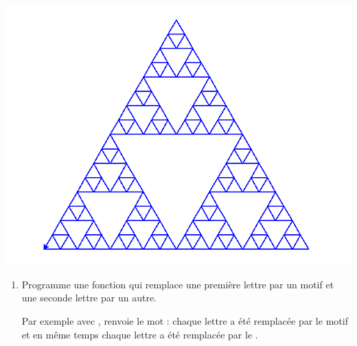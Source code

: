 \documentclass[11pt,class=report,crop=false]{standalone}
\begin{document}
\begin{activite}
\begin{enumerate}
\end{enumerate}



\end{activite}




\begin{activite}



\begin{center}	
\includegraphics[scale=\myscale,scale=0.35]{ecran-lsysteme-7e}
\end{center}

\begin{enumerate}
  \item Programme une fonction  qui remplace une première lettre par un motif et une seconde lettre par un autre. 

Par exemple avec ,  renvoie le mot  : chaque lettre  a été remplacée par le motif  et en même temps chaque lettre  a été remplacée par le .


\end{enumerate}
\end{activite}
\end{document}
